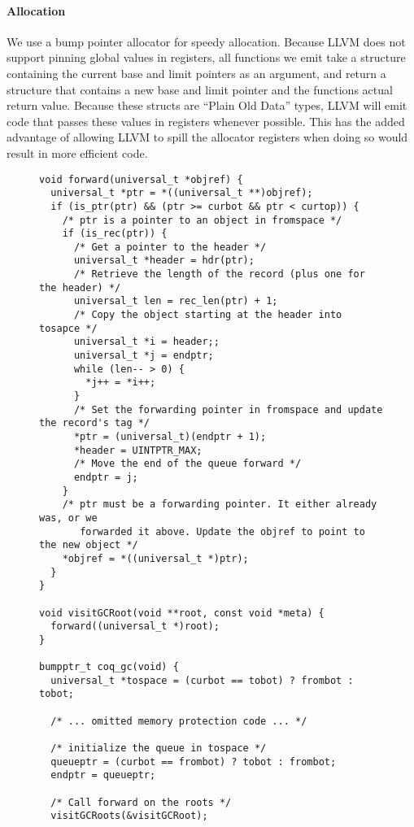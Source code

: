\documentclass{article}
\begin{document}
\paragraph{Allocation} We use a bump pointer allocator for speedy allocation. Because LLVM does not support pinning global values in registers, all functions we emit take a structure containing the current base and limit pointers as an argument, and return a structure that contains a new base and limit pointer and the functions actual return value. Because these structs are ``Plain Old Data'' types, LLVM will emit code that passes these values in registers whenever possible. This has the added advantage of allowing LLVM to spill the allocator registers when doing so would result in more efficient code.

\begin{figure}
\begin{lstlisting}
void forward(universal_t *objref) {
  universal_t *ptr = *((universal_t **)objref);
  if (is_ptr(ptr) && (ptr >= curbot && ptr < curtop)) {
    /* ptr is a pointer to an object in fromspace */
    if (is_rec(ptr)) {
      /* Get a pointer to the header */
      universal_t *header = hdr(ptr);
      /* Retrieve the length of the record (plus one for the header) */
      universal_t len = rec_len(ptr) + 1;
      /* Copy the object starting at the header into tosapce */
      universal_t *i = header;;
      universal_t *j = endptr;
      while (len-- > 0) {
        *j++ = *i++;
      }
      /* Set the forwarding pointer in fromspace and update the record's tag */
      *ptr = (universal_t)(endptr + 1);
      *header = UINTPTR_MAX;
      /* Move the end of the queue forward */
      endptr = j;
    }
    /* ptr must be a forwarding pointer. It either already was, or we 
       forwarded it above. Update the objref to point to the new object */
    *objref = *((universal_t *)ptr);
  }
}

void visitGCRoot(void **root, const void *meta) {
  forward((universal_t *)root);
}

bumpptr_t coq_gc(void) {
  universal_t *tospace = (curbot == tobot) ? frombot : tobot;

  /* ... omitted memory protection code ... */

  /* initialize the queue in tospace */
  queueptr = (curbot == frombot) ? tobot : frombot;
  endptr = queueptr;

  /* Call forward on the roots */
  visitGCRoots(&visitGCRoot);


\end{lstlisting}
\end{figure}
\end{document}
